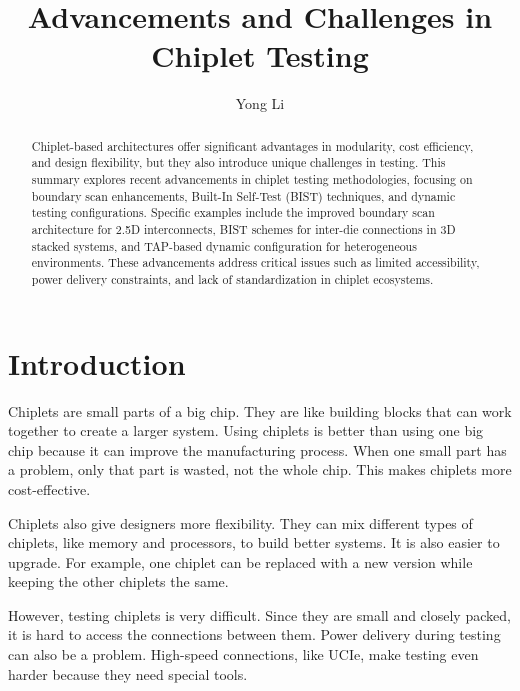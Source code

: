 \documentclass[acmtog, 12pt]{acmart}
\begin{document}
\title{Advancements and Challenges in Chiplet Testing}

\author{Yong Li}



\begin{abstract}
  Chiplet-based architectures offer significant advantages in modularity, cost efficiency, and design flexibility, but they also introduce unique challenges in testing. This summary explores recent advancements in chiplet testing methodologies, focusing on boundary scan enhancements, Built-In Self-Test (BIST) techniques, and dynamic testing configurations. Specific examples include the improved boundary scan architecture for 2.5D interconnects, BIST schemes for inter-die connections in 3D stacked systems, and TAP-based dynamic configuration for heterogeneous environments. These advancements address critical issues such as limited accessibility, power delivery constraints, and lack of standardization in chiplet ecosystems.
  \end{abstract}
  
    
    
\maketitle


\section*{Introduction}

Chiplets are small parts of a big chip. They are like building blocks that can work together to create a larger system. Using chiplets is better than using one big chip because it can improve the manufacturing process. When one small part has a problem, only that part is wasted, not the whole chip. This makes chiplets more cost-effective.

Chiplets also give designers more flexibility. They can mix different types of chiplets, like memory and processors, to build better systems. It is also easier to upgrade. For example, one chiplet can be replaced with a new version while keeping the other chiplets the same.

However, testing chiplets is very difficult. Since they are small and closely packed, it is hard to access the connections between them. Power delivery during testing can also be a problem. High-speed connections, like UCIe, make testing even harder because they need special tools.
\end{document}
